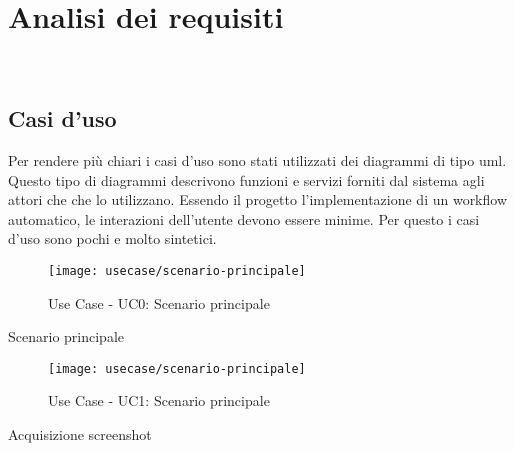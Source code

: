 \chapter{Analisi dei requisiti}
\label{cap:analisi-requisiti}

\\

\section{Casi d'uso}
Per rendere più chiari i casi d'uso sono stati utilizzati dei diagrammi di tipo \gls{uml}.
Questo tipo di diagrammi descrivono funzioni e servizi forniti dal sistema agli attori che che lo utilizzano.
Essendo il progetto l'implementazione di un workflow automatico, le interazioni dell'utente devono essere minime.
Per questo i casi d'uso sono pochi e molto sintetici.
\begin{figure}[!h] 
    \centering 
    \texttt{[image: usecase/scenario-principale]} 
    \caption{Use Case - UC0: Scenario principale}
\end{figure}

\begin{usecase}{0}{Scenario principale}
    \label{uc:scenario-principale}
\end{usecase}

\begin{figure}[!h] 
    \centering 
    \texttt{[image: usecase/scenario-principale]} 
    \caption{Use Case - UC1: Scenario principale}
\end{figure}

\begin{usecase}{1}{Acquisizione screenshot} 
    \label{uc:acquisizione-screenshot} 
\end{usecase}
 
